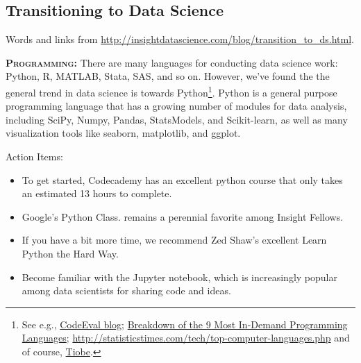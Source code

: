 \documentclass[11pt,a4paper]{article}
\begin{document}



\subsection*{Transitioning to Data Science}
\noindent
Words and links from \href{http://insightdatascience.com/blog/transition\_to\_ds.html}{http://insightdatascience.com/blog/transition\_to\_ds.html}. 

\smallskip
\smallskip
\noindent
\textbf{\textsc{Programming:}}
There are many languages for conducting data science work: Python, R,
MATLAB, Stata, SAS, and so on. However, we've found the the general
trend in data science is towards Python\footnote{See e.g.,
\href{http://blog.codeeval.com/codeevalblog/2015\#.V5qxlpMrKRs}{CodeEval blog};
\href{http://www.codingdojo.com/blog/9-most-in-demand-programming-languages-of-2016/}{Breakdown
of the 9 Most In-Demand Programming Languages}; 
\href{http://statisticstimes.com/tech/top-computer-languages.php}{http://statisticstimes.com/tech/top-computer-languages.php} and of course, 
\href{http://www.tiobe.com/tiobe_index}{Tiobe}.}.
Python is a general purpose programming language that has a growing
number of modules for data analysis, including SciPy, Numpy, Pandas,
StatsModels, and Scikit-learn, as well as many visualization tools
like seaborn, matplotlib, and ggplot.

\smallskip
\smallskip
\noindent
Action Items:
\begin{itemize}
\item{To get started, Codecademy has an excellent python course that only
takes an estimated 13 hours to complete.}  
\item{Google's Python Class. remains a perennial favorite among Insight Fellows.}
\item{If you have a bit more time, we recommend Zed Shaw's excellent Learn Python the Hard Way.}
\item{Become familiar with the Jupyter notebook, which is increasingly popular among data scientists for sharing code and ideas.}
\end{itemize}
\end{document}
